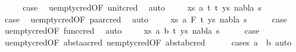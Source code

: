 \begin{isabellebody}
\ \ \isamarkupfalse%
\ \isamarkupfalse%
\ {\isacharquery}{\kern0pt}case\ \isamarkupfalse%
\ u{\isacharunderscore}{\kern0pt}empty{\isacharunderscore}{\kern0pt}cred{\isacharbrackleft}{\kern0pt}OF\ unit{\isacharunderscore}{\kern0pt}cred{\isacharbrackright}{\kern0pt}\ \isamarkupfalse%
\ auto\isanewline
{}\isamarkupfalse%
\isanewline
\ \ \isamarkupfalse%
\ {\isacharparenleft}{\kern0pt}{}\ xs\ a\ t{}\ t{}\ ys\ nabla\ s{\isacharparenright}{\kern0pt}\isanewline
\ \ \isamarkupfalse%
\ \isamarkupfalse%
\ {\isacharquery}{\kern0pt}case\ \isamarkupfalse%
\ u{\isacharunderscore}{\kern0pt}empty{\isacharunderscore}{\kern0pt}cred{\isacharbrackleft}{\kern0pt}OF\ paar{\isacharunderscore}{\kern0pt}cred{\isacharbrackright}{\kern0pt}\ \isamarkupfalse%
\ auto\isanewline
{}\isamarkupfalse%
\isanewline
\ \ \isamarkupfalse%
\ {\isacharparenleft}{\kern0pt}{}\ xs\ a\ F\ t\ ys\ nabla\ s{\isacharparenright}{\kern0pt}\isanewline
\ \ \isamarkupfalse%
\ \isamarkupfalse%
\ {\isacharquery}{\kern0pt}case\ \isamarkupfalse%
\ u{\isacharunderscore}{\kern0pt}empty{\isacharunderscore}{\kern0pt}cred{\isacharbrackleft}{\kern0pt}OF\ func{\isacharunderscore}{\kern0pt}cred{\isacharbrackright}{\kern0pt}\ \isamarkupfalse%
\ auto\isanewline
{}\isamarkupfalse%
\isanewline
\ \ \isamarkupfalse%
\ {\isacharparenleft}{\kern0pt}{}\ xs\ a\ b\ t\ ys\ nabla\ s{\isacharparenright}{\kern0pt}\isanewline
\ \ \isamarkupfalse%
\ \isamarkupfalse%
\ {\isacharquery}{\kern0pt}case\ \isanewline
\ \ \ \ \isamarkupfalse%
\ u{\isacharunderscore}{\kern0pt}empty{\isacharunderscore}{\kern0pt}cred{\isacharbrackleft}{\kern0pt}OF\ abst{\isacharunderscore}{\kern0pt}aa{\isacharunderscore}{\kern0pt}cred{\isacharbrackright}{\kern0pt}\ u{\isacharunderscore}{\kern0pt}empty{\isacharunderscore}{\kern0pt}cred{\isacharbrackleft}{\kern0pt}OF\ abst{\isacharunderscore}{\kern0pt}ab{\isacharunderscore}{\kern0pt}cred{\isacharbrackright}{\kern0pt}\isanewline
\ \ \ \ \isamarkupfalse%
\ {\isacharparenleft}{\kern0pt}cases\ {\isachardoublequoteopen}a\ {\isacharequal}{\kern0pt}\ b{\isachardoublequoteclose}{\isacharparenright}{\kern0pt}\ auto\isanewline
{}\isamarkupfalse%

\end{isabellebody}

